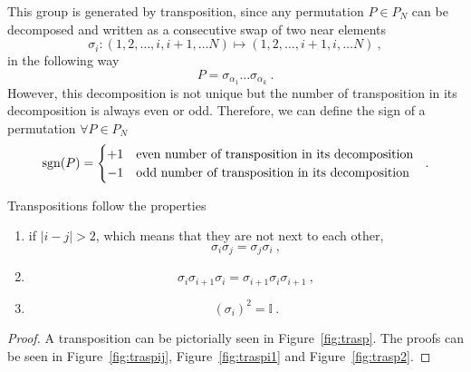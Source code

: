     This group is generated by transposition, since any permutation $P \in P_N$ can be decomposed and written as a consecutive swap of two near elements 
    \begin{equation*}
        \sigma_i \colon (1,2,\ldots, i, i+1, \ldots N) \mapsto (1,2,\ldots, i+1, i, \ldots N) ~,
    \end{equation*}
    in the following way 
    \begin{equation}\label{decomp}
        P = \sigma_{\alpha_1} \ldots \sigma_{\alpha_k} ~.
    \end{equation}
    However, this decomposition is not unique but the number of transposition in its decomposition is always even or odd. Therefore, we can define the sign of a permutation $\forall P \in P_N$
    \begin{equation*}
        \operatorname{sgn}(P) = \begin{cases}
            + 1 & \textnormal{even number of transposition in its decomposition } \\
            - 1 & \textnormal{odd number of transposition in its decomposition } \\
        \end{cases} ~.
    \end{equation*}

    Transpositions follow the properties 
    \begin{enumerate}
        \item if $|i - j| > 2$, which means that they are not next to each other,
        \begin{equation}\label{prop1}
            \sigma_i \sigma_j = \sigma_j \sigma_i ~,
        \end{equation} 
        \item \begin{equation}\label{prop2}
            \sigma_i \sigma_{i+1} \sigma_i = \sigma_{i+1} \sigma_i \sigma_{i+1} ~,
        \end{equation}
        \item \begin{equation}\label{prop3}
            (\sigma_i)^2 = \mathbb I ~.
        \end{equation}
    \end{enumerate}
    \begin{proof}
        A transposition can be pictorially seen in Figure~\ref{fig:trasp}. The proofs can be seen in Figure~\ref{fig:traspij}, Figure~\ref{fig:traspi1} and Figure~\ref{fig:trasp2}.
    \end{proof}

